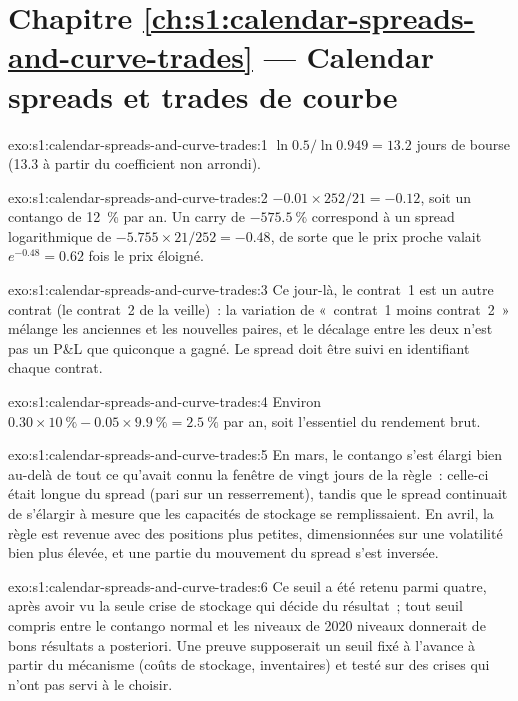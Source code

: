 \section*{Chapitre \ref{ch:s1:calendar-spreads-and-curve-trades} --- Calendar spreads et trades de courbe}

\begin{solution}{exo:s1:calendar-spreads-and-curve-trades:1}
$\ln 0.5/\ln 0.949 = 13.2$ jours de bourse (13.3 à partir du coefficient non arrondi).
\end{solution}

\begin{solution}{exo:s1:calendar-spreads-and-curve-trades:2}
$-0.01 \times 252/21 = -0.12$, soit un contango de 12~\% par an. Un carry de $-575.5~\%$ correspond à un spread logarithmique de $-5.755 \times 21/252 = -0.48$, de sorte que le prix proche
valait $e^{-0.48} = 0.62$ fois le prix éloigné.
\end{solution}

\begin{solution}{exo:s1:calendar-spreads-and-curve-trades:3}
Ce jour-là, le contrat~1 est un autre contrat (le contrat~2 de la veille)~: la variation de «~contrat~1 moins contrat~2~» mélange les anciennes et les nouvelles paires, et
le décalage entre les deux n'est pas un P\&L que quiconque a gagné. Le spread doit être suivi en identifiant chaque contrat.
\end{solution}

\begin{solution}{exo:s1:calendar-spreads-and-curve-trades:4}
Environ $0.30 \times 10~\% - 0.05 \times 9.9~\% = 2.5~\%$ par an, soit l'essentiel du rendement brut.
\end{solution}

\begin{solution}{exo:s1:calendar-spreads-and-curve-trades:5}
En mars, le contango s'est élargi bien au-delà de tout ce qu'avait connu la fenêtre de vingt jours de la règle~: celle-ci était longue du spread (pari sur un resserrement), tandis que le
spread continuait de s'élargir à mesure que les capacités de stockage se remplissaient. En avril, la règle est revenue avec des positions plus petites, dimensionnées sur une volatilité bien plus élevée, et une partie du mouvement du spread s'est inversée.
\end{solution}

\begin{solution}{exo:s1:calendar-spreads-and-curve-trades:6}
Ce seuil a été retenu parmi quatre, après avoir vu la seule crise de stockage qui décide du résultat~; tout seuil compris entre le contango normal et les niveaux de 2020
niveaux donnerait de bons résultats a posteriori. Une preuve supposerait un seuil fixé à l'avance à partir du mécanisme (coûts de stockage, inventaires) et testé sur
des crises qui n'ont pas servi à le choisir.
\end{solution}

